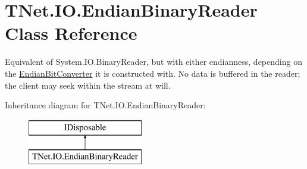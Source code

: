 \hypertarget{class_t_net_1_1_i_o_1_1_endian_binary_reader}{}\section{T\+Net.\+I\+O.\+Endian\+Binary\+Reader Class Reference}
\label{class_t_net_1_1_i_o_1_1_endian_binary_reader}


Equivalent of System.\+I\+O.\+Binary\+Reader, but with either endianness, depending on the \mbox{\hyperlink{class_t_net_1_1_i_o_1_1_endian_bit_converter}{Endian\+Bit\+Converter}} it is constructed with. No data is buffered in the reader; the client may seek within the stream at will.  


Inheritance diagram for T\+Net.\+I\+O.\+Endian\+Binary\+Reader\+:\begin{figure}[H]
\begin{center}
\leavevmode
\includegraphics[height=2.000000cm]{class_t_net_1_1_i_o_1_1_endian_binary_reader}
\end{center}
\end{figure}
